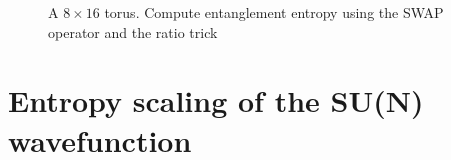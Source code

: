 \documentclass{article}
\begin{document}
%
\begin{figure}[h]
	\begin{center}
	\end{center}
	\caption{A $8\times16$ torus. Compute entanglement entropy using the SWAP operator and the ratio trick}
	\label{fig:torus}
\end{figure}
%

\section{Entropy scaling of the SU(N) wavefunction}
\end{document}
